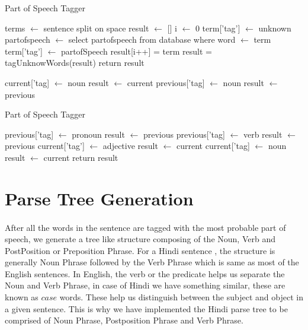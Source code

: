 \begin{algorithm}
\caption{Part of Speech Tagger}\label{alg:brilltaggervariant}
\begin{algorithmic}[1]
\State terms $\gets$ sentence split on space 
\State result $\gets$ []
\State i $\gets$ 0
\State term['tag'] $\gets$ unknown
\State partofspeech $\gets$ select partofspeech from database where word $\gets$ term
\State term['tag'] $\gets$ partofSpeech 
\EndIf
\State result[i++] = term
\EndFor
\State result = tagUnknowWords(result)
\State return result
\EndProcedure

\State current['tag] $\gets$ noun
\State result $\gets$ current
\EndIf
{}
\State previous['tag] $\gets$ noun
\State result $\gets$ previous
\EndIf		
{}		
\end{algorithmic}
\end{algorithm}
\begin{algorithm}
\caption{Part of Speech Tagger}\label{alg:brilltaggervariant}              
\begin{algorithmic}                 
\State previous['tag] $\gets$ pronoun
\State result $\gets$ previous
\EndIf
{}
\State previous['tag] $\gets$ verb
\State result $\gets$ previous
\EndIf
{}
\State current['tag'] $\gets$ adjective
\State result $\gets$ current
\EndIf
{}
\State  current['tag] $\gets$ noun
\State result $\gets$ current
\EndIf
\EndFor
\State return result
\EndProcedure
\end{algorithmic}
\end{algorithm}
\break

\section {Parse Tree Generation}
\paragraph{}
After all the words in the sentence are tagged with the most probable part of speech, we generate a tree like structure composing of the Noun, Verb and PostPosition or Preposition Phrase. For a Hindi sentence \cite{bhat2017improving}, the structure is generally Noun Phrase followed by the Verb Phrase which is same as most of the English sentences. In English, the verb or the predicate helps us separate the Noun and Verb Phrase, in case of Hindi we have something similar, these are known as $case$ words. These help us distinguish between the subject and object in a given sentence. This is why we have implemented the Hindi parse tree to be comprised of Noun Phrase, Postposition Phrase and Verb Phrase. 

